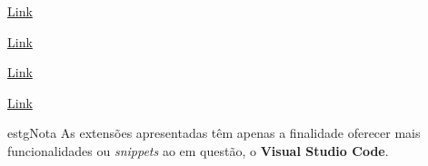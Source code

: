 \vspace{0.25cm}

\begin{minipage}[t]{0.5\textwidth}
	\centering
	
	\href{https://marketplace.visualstudio.com/items?itemName=formulahendry.auto-close-tag}{Link}
\end{minipage}
\begin{minipage}[t]{0.5\textwidth}
	\centering
	
	\href{https://marketplace.visualstudio.com/items?itemName=formulahendry.auto-rename-tag}{Link}
\end{minipage}

\vspace{0.25cm}

\begin{minipage}[t]{0.5\textwidth}
	\centering
	
	\href{https://marketplace.visualstudio.com/items?itemName=dbaeumer.vscode-eslint}{Link}
\end{minipage}
\begin{minipage}[t]{0.5\textwidth}
	\centering
	
	\href{https://marketplace.visualstudio.com/items?itemName=Syler.sass-indented}{Link}
\end{minipage}

\begin{mybox}{estg}{Nota}
	As extensões apresentadas têm apenas a finalidade oferecer mais funcionalidades ou \textit{snippets} ao  em questão, o \textbf{Visual Studio Code}.
\end{mybox}